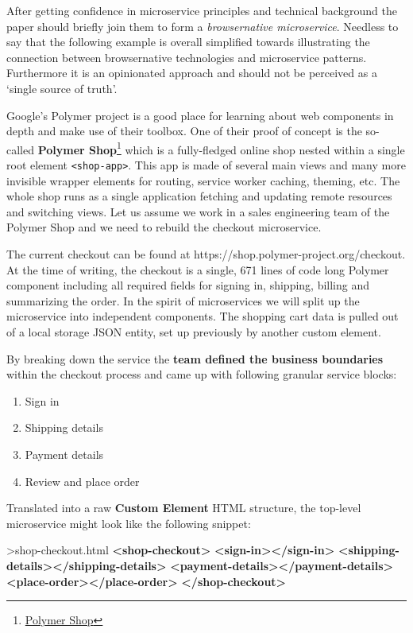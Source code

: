 \documentclass[]{article}
\newenvironment{Shaded}{}{}
\newcommand{\KeywordTok}[1]{\textcolor[rgb]{0.00,0.44,0.13}{\textbf{{#1}}}}
\newcommand{\NormalTok}[1]{{#1}}
\providecommand{\tightlist}{%
  \setlength{\itemsep}{0pt}\setlength{\parskip}{0pt}}
\begin{document}
After getting confidence in microservice principles and technical
background the paper should briefly join them to form a
\emph{browsernative microservice}. Needless to say that the following
example is overall simplified towards illustrating the connection
between browsernative technologies and microservice patterns.
Furthermore it is an opinionated approach and should not be perceived as
a `single source of truth'.

Google's Polymer project is a good place for learning about web
components in depth and make use of their toolbox. One of their proof of
concept is the so-called \textbf{Polymer Shop}\footnote{\href{https://shop.polymer-project.org/}{Polymer
  Shop}} which is a fully-fledged online shop nested within a single
root element \texttt{\textless{}shop-app\textgreater{}}. This app is
made of several main views and many more invisible wrapper elements for
routing, service worker caching, theming, etc. The whole shop runs as a
single application fetching and updating remote resources and switching
views. Let us assume we work in a sales engineering team of the Polymer
Shop and we need to rebuild the checkout microservice.

The current checkout can be found at
https://shop.polymer-project.org/checkout. At the time of writing, the
checkout is a single, 671 lines of code long Polymer component including
all required fields for signing in, shipping, billing and summarizing
the order. In the spirit of microservices we will split up the
microservice into independent components. The shopping cart data is
pulled out of a local storage JSON entity, set up previously by another
custom element.

By breaking down the service the \textbf{team defined the business
boundaries} within the checkout process and came up with following
granular service blocks:

\begin{enumerate}
\def\labelenumi{\arabic{enumi}.}
\tightlist
\item
  Sign in
\item
  Shipping details
\item
  Payment details
\item
  Review and place order
\end{enumerate}

Translated into a raw \textbf{Custom Element} HTML structure, the
top-level microservice might look like the following snippet:

\begin{Shaded}
\begin{Highlighting}[]
\NormalTok{>shop-checkout.html}
\KeywordTok{<shop-checkout>}
  \KeywordTok{<sign-in></sign-in>}
  \KeywordTok{<shipping-details></shipping-details>}
  \KeywordTok{<payment-details></payment-details>}
  \KeywordTok{<place-order></place-order>}
\KeywordTok{</shop-checkout>}
\end{Highlighting}
\end{Shaded}
\end{document}
